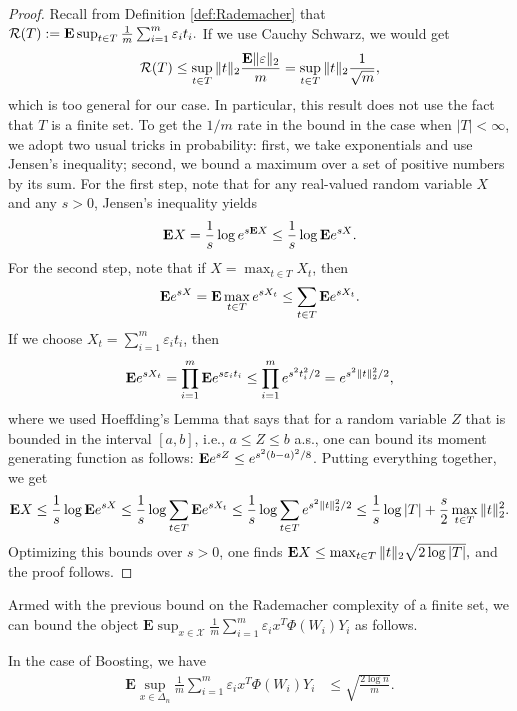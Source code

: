 \begin{proof}
Recall from Definition \ref{def:Rademacher} that
$
	\mathcal{R}(T) := \E \sup_{t\in T} \frac{1}{m} \sum_{i=1}^m \varepsilon_i t_i.
$
If we use Cauchy Schwarz, we would get
$$
	\mathcal{R}(T)
	\le
	\sup_{t\in T} \| t \|_2 \frac{\E \| \varepsilon \|_2}{m} = \sup_{t\in T} \| t \|_2 \frac{1}{\sqrt{m}},
$$
which is too general for our case. In particular, this result does not use the fact that $T$ is a finite set. To get the $1/m$ rate in the bound in the case when $|T|<\infty$, we adopt two usual tricks in probability: first, we take exponentials and use Jensen's inequality; second, we bound a maximum over a set of positive numbers by its sum.
For the first step, note that for any real-valued random variable $X$ and any $s>0$, Jensen's inequality yields
$$
	\mathbf{E} X = \frac{1}{s} \log e^{s \mathbf{E} X}
	\le \frac{1}{s} \log \mathbf{E} e^{s X}.
$$
For the second step, note that if $X=\max_{t\in T} X_t$, then
$$
	\mathbf{E} e^{s X} = \mathbf{E} \max_{t\in T} e^{sX_t}
	\le \sum_{t\in T} \mathbf{E} e^{sX_t}.
$$
If we choose $X_t=\sum_{i=1}^m \varepsilon_i t_i$, then
$$
	\E e^{sX_t}
	= \prod_{i=1}^m \E e^{s\varepsilon_it_i}
	\le
	\prod_{i=1}^m e^{s^2 t_i^2/2}
	=
	e^{s^2 \| t \|_2^2 /2},
$$
where we used Hoeffding's Lemma that says that for a random variable $Z$ that is bounded in the interval $[a,b]$, i.e., $a\le Z \le b$ a.s., one can bound its moment generating function as follows: $\mathbf{E} e^{sZ} \le e^{s^2(b-a)^2/8}$. Putting everything together, we get
$$
	\mathbf{E} X
	\le \frac{1}{s} \log \mathbf{E} e^{s X}
	\le \frac{1}{s} \log \sum_{t\in T} \mathbf{E} e^{sX_t}
	\le \frac{1}{s} \log \sum_{t\in T} e^{s^2 \| t \|_2^2 /2}
	\le \frac{1}{s} \log |T| + \frac{s}{2} \max_{t\in T} \| t \|_2^2.
$$
Optimizing this bounds over $s>0$, one finds
$
	\mathbf{E} X \le \max_{t\in T} \| t \|_2 \sqrt{2 \log|T|},
$
and the proof follows.
\end{proof}

Armed with the previous bound on the Rademacher complexity of a finite set, we can bound the object $\mathbf{E} \sup_{x\in\mathcal{X}} \frac{1}{m}\sum_{i=1}^m\varepsilon_i x^T\Phi(W_i)Y_i$ as follows.
\begin{proposition}
\label{bound:radBoosting}
In the case of Boosting, we have
\begin{align*}
	\mathbf{E} \sup_{x\in\Delta_n} \frac{1}{m}\sum_{i=1}^m\varepsilon_i x^T\Phi(W_i)Y_i
	&\le 
	\sqrt{\frac{2\log n}{m}}.
\end{align*}
\end{proposition}


